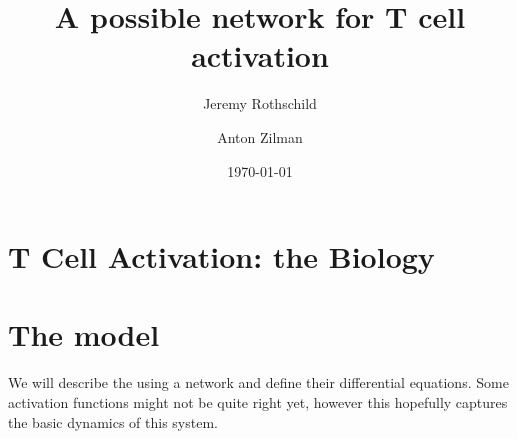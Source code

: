 \documentclass[aip, jmp, amsmath,amssymb, preprint, reprint, author-year,%
]{revtex4-1}
\begin{document}

\title[T Cell Activation]{A possible network for T cell activation}%

\author{Jeremy Rothschild}
\author{Anton Zilman}%


\date{\today}%


\maketitle



\section{\label{sec:bio}T Cell Activation: the Biology}


\section{\label{sec:model}The model}

We will describe the using a network and define their differential equations. Some activation functions might not be quite right yet, however this hopefully captures the basic dynamics of this system.




%
\end{document}
